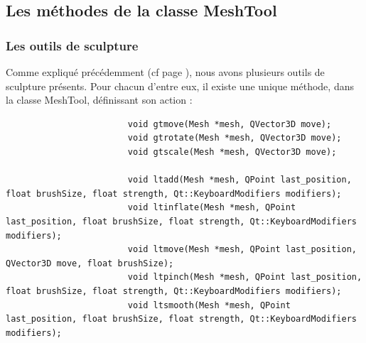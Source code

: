 \documentclass[a4paper]{memoir}
\begin{document}
			\subsection{Les méthodes de la classe MeshTool}
				\label{tool-dev}
				\subsubsection{Les outils de sculpture}
					Comme expliqué précédemment (cf page \pageref{tool-cdc}), nous avons plusieurs outils de sculpture présents. Pour chacun d'entre eux, 
					il existe une unique méthode, dans la classe MeshTool, définissant son action :
					\begin{verbatim}
						void gtmove(Mesh *mesh, QVector3D move);
						void gtrotate(Mesh *mesh, QVector3D move);
						void gtscale(Mesh *mesh, QVector3D move);

						void ltadd(Mesh *mesh, QPoint last_position, float brushSize, float strength, Qt::KeyboardModifiers modifiers);
						void ltinflate(Mesh *mesh, QPoint last_position, float brushSize, float strength, Qt::KeyboardModifiers modifiers);
						void ltmove(Mesh *mesh, QPoint last_position, QVector3D move, float brushSize);
						void ltpinch(Mesh *mesh, QPoint last_position, float brushSize, float strength, Qt::KeyboardModifiers modifiers);
						void ltsmooth(Mesh *mesh, QPoint last_position, float brushSize, float strength, Qt::KeyboardModifiers modifiers);
					\end{verbatim}
\end{document}
